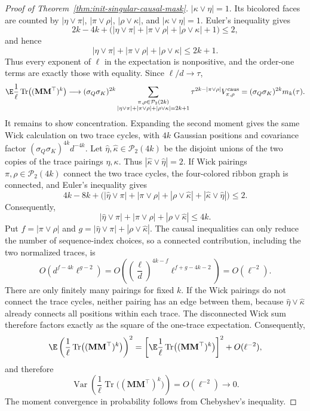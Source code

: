 \documentclass{article}
\newcommand{\bM}{\mathbf{M}}
\theoremstyle{definition}
\theoremstyle{remark}
\begin{document}
\begin{proof}[Proof of Theorem~\ref{thm:init-singular-causal-mask}]
$|\kappa\vee\eta|=1$.  Its bicolored faces are counted by
$|\eta\vee\pi|$, $|\pi\vee\rho|$, $|\rho\vee\kappa|$, and
$|\kappa\vee\eta|=1$.  Euler's inequality gives
\[
    2k-4k+\bigl(|\eta\vee\pi|+|\pi\vee\rho|+|\rho\vee\kappa|+1\bigr)
    \leq 2,
\]
and hence
\[
    |\eta\vee\pi|+|\pi\vee\rho|+|\rho\vee\kappa|
    \leq
    2k+1.
\]
Thus every exponent of $\ell$ in the expectation is nonpositive, and the
order-one terms are exactly those with equality.  Since $\ell/d\to\tau$,
\[
\E\frac1\ell\operatorname{Tr}\bigl((\bM\bM^\top)^k\bigr)
\longrightarrow
(\sigma_Q\sigma_K)^{2k}
\sum_{\substack{\pi,\rho\in\mathcal P_2(2k)\\
|\eta\vee\pi|+|\pi\vee\rho|+|\rho\vee\kappa|=2k+1}}
\tau^{2k-|\pi\vee\rho|}V_{\pi,\rho}^{\mathrm{caus}}
=
(\sigma_Q\sigma_K)^{2k}m_k(\tau).
\]
It remains to show concentration.  Expanding the second moment gives the same
Wick calculation on two trace cycles, with $4k$ Gaussian positions and
covariance factor $(\sigma_Q\sigma_K)^{4k}d^{-4k}$.  Let
$\widehat\eta,\widehat\kappa\in\mathcal P_2(4k)$ be the disjoint unions of the
two copies of the trace pairings $\eta,\kappa$.  Thus
$|\widehat\kappa\vee\widehat\eta|=2$.  If Wick pairings
$\pi,\rho\in\mathcal P_2(4k)$ connect the two trace cycles, the four-colored
ribbon graph is connected, and Euler's inequality gives
\[
4k-8k+\bigl(|\widehat\eta\vee\pi|+|\pi\vee\rho|
  +|\rho\vee\widehat\kappa|
  +|\widehat\kappa\vee\widehat\eta|\bigr)
\leq 2.
\]
Consequently,
\[
    |\widehat\eta\vee\pi|+|\pi\vee\rho|
    +|\rho\vee\widehat\kappa|
    \leq 4k.
\]
Put $f=|\pi\vee\rho|$ and
$g=|\widehat\eta\vee\pi|+|\rho\vee\widehat\kappa|$.  The causal
inequalities can only reduce the number of sequence-index choices, so a
connected contribution, including the two normalized traces, is
\[
    O\left(d^{f-4k}\ell^{g-2}\right)
    =
    O\left(
      \left(\frac{\ell}{d}\right)^{4k-f}
      \ell^{f+g-4k-2}
    \right)
    =O(\ell^{-2}).
\]
There are only finitely many pairings for fixed $k$.  If the Wick pairings do
not connect the trace cycles, neither pairing has an edge between them, because
$\widehat\eta\vee\widehat\kappa$ already connects all positions within each
trace.  The disconnected Wick sum therefore factors exactly as the square of
the one-trace expectation.  Consequently,
\[
    \E\left(\frac1\ell\operatorname{Tr}\bigl((\bM\bM^\top)^k\bigr)\right)^2
    =
    \left[
    \E\frac1\ell\operatorname{Tr}\bigl((\bM\bM^\top)^k\bigr)
    \right]^2
    +O(\ell^{-2}),
\]
and therefore
\[
    \operatorname{Var}\left(\frac1\ell\operatorname{Tr}\bigl((\bM\bM^\top)^k\bigr)\right)
    =O(\ell^{-2})\longrightarrow 0.
\]
The moment convergence in probability follows from Chebyshev's inequality.


\end{proof}
\end{document}
